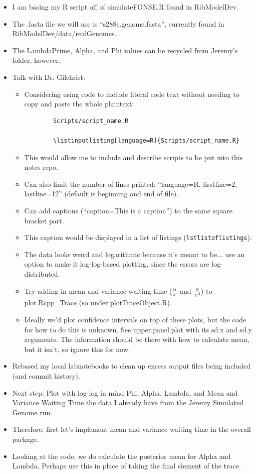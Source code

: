 \documentclass[12pt,hyperref]{labbook}
\newcommand{\sep}{\discretionary{}{}{}} %
\begin{document}
\begin{itemize}
    \item I am basing my R script off of simulate\sep FONSE\sep .\sep R found in Rib\sep Model\sep Dev.
    \item The .fasta file we will use is \enquote{s288c.genome.fasta}, currently found in Rib\sep Model\sep Dev\sep /\sep data\sep /\sep real\sep Genomes.
    \item The LambdaPrime, Alpha, and Phi values can be recycled from Jeremy's folder, however.
    \item Talk with Dr. Gilchrist:
    \begin{itemize}
        \item Considering using code to include literal code text without needing to copy and paste the whole plaintext:
        \begin{lstlisting}
        Scripts/script_name.R

        \listinputlisting[language=R]{Scripts/script_name.R}
        \end{lstlisting}
        \item This would allow me to include and describe scripts to be put into this notes repo.
        \item Can also limit the number of lines printed: \enquote{language=R, firstline=2, lastline=12} (default is beginning and end of file).
        \item Can add captions (\enquote{caption=This is a caption}) to the same square bracket part.
        \item This caption would be displayed in a list of listings (\verb+lstlistoflistings+).
        \item The data looks weird and logarithmic because it's meant to be... use an option to make it log-log-based plotting, since the errors are log-distributed.
        \item Try adding in mean and variance waiting time ($\frac{\alpha}{\lambda\prime}$ and $\frac{\alpha}{\lambda\prime^2}$) to plot\sep .\sep Rcpp\sep \_\sep Trace (so under plot\sep Trace\sep Object\sep .\sep R).
        \item Ideally we'd plot confidence intervals on top of these plots, but the code for how to do this is unknown.
        See upper\sep .\sep panel\sep .\sep plot with its sd.x and sd.y arguments.
        The information should be there with how to calculate mean, but it isn't, so ignore this for now.
    \end{itemize}
    \item Rebased my local labnotebooks to clean up excess output files being included (and commit history).
    \item Next step: Plot with log-log in mind Phi, Alpha, Lambda, and Mean and Variance Waiting Time the data I already have from the Jeremy Simulated Genome run.
    \item Therefore, first let's implement mean and variance waiting time in the overall package.
    \item Looking at the code, we do calculate the posterior mean for Alpha and Lambda.
    Perhaps use this in place of taking the final element of the trace.
\end{itemize}
\end{document}

